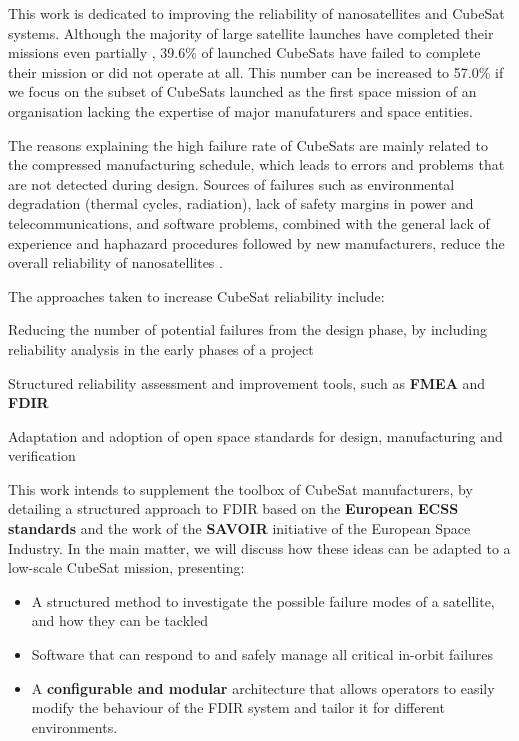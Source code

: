 \documentclass[a4paper,nobib,final]{tufte-book}
\begin{document}
\marginpar{\vspace{1cm}}

This work is dedicated to improving the reliability of nanosatellites and CubeSat systems. Although the majority of large satellite launches have completed their missions even partially \autocite{kattakuri_failures_spacecraft_2019,jacklin_smallsatellite_mission_2019}, 39.6\% of launched CubeSats have failed to complete their mission or did not operate at all. This number can be increased to 57.0\% if we focus on the subset of CubeSats launched as the first space mission of an organisation lacking the expertise of major manufaturers and space entities.

The reasons explaining the high failure rate of CubeSats are mainly related to the compressed manufacturing schedule, which leads to errors and problems that are not detected during design. Sources of failures such as environmental degradation (thermal cycles, radiation), lack of safety margins in power and telecommunications, and software problems, combined with the general lack of experience and haphazard procedures followed by new manufacturers, reduce the overall reliability of nanosatellites \autocite{swartwout_cubesat_mission_2019,langer_reliability_estimation_2017}.

The approaches taken to increase CubeSat reliability include:
\begin{compactitem}
	\item Reducing the number of potential failures from the design phase, by including reliability analysis in the early phases of a project
	\item Structured reliability assessment and improvement tools, such as \textbf{\acf{FMEA}} and \textbf{\acf{FDIR}} \autocite{faure_lean_satellites_2017,menchinelli_reliability_engineering_2018}
	\item Adaptation and adoption of open space standards for design, manufacturing and verification
\end{compactitem}


This work intends to supplement the toolbox of CubeSat manufacturers, by detailing a structured approach to \ac{FDIR} based on the \textbf{European \acs{ECSS} standards} and the work of the \textbf{\acs{SAVOIR}} initiative of the European Space Industry. In the main matter, we will discuss how these ideas can be adapted to a low-scale CubeSat mission, presenting:
\begin{itemize}
	\item A structured method to investigate the possible failure modes of a satellite, and how they can be tackled
	\item Software that can respond to and safely manage all critical in-orbit failures
	\item A \textbf{configurable and modular} architecture that allows operators to easily modify the behaviour of the \acs{FDIR} system and tailor it for different environments.
\end{itemize}
\end{document}
